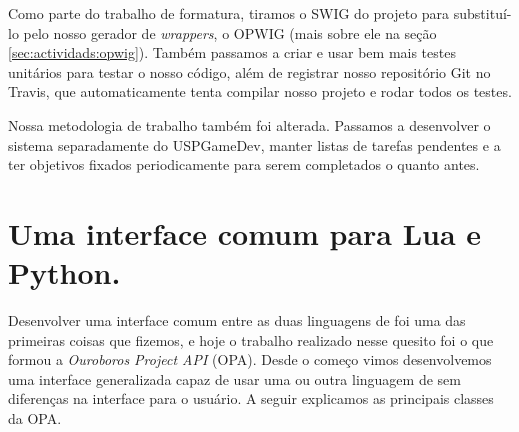 
  Como parte do trabalho de formatura, tiramos o SWIG do projeto para substituí-lo
  pelo nosso gerador de \textit{wrappers}, o OPWIG (mais sobre ele na seção 
  \ref{sec:actividads:opwig}). Também passamos a criar e usar bem mais testes
  unitários para testar o nosso código, além de registrar nosso repositório Git
  no Travis\footnotemark, que automaticamente tenta compilar nosso projeto e
  rodar todos os testes.
  
  
  Nossa metodologia de trabalho também foi alterada. Passamos a desenvolver o
  sistema separadamente do USPGameDev, manter listas de tarefas pendentes e a
  ter objetivos fixados periodicamente para serem completados o quanto antes.
  
  \section{Uma interface comum para Lua e Python.}
  \label{sec:atividades:opa}
  Desenvolver uma interface comum entre as duas linguagens de \script{} foi uma das 
  primeiras coisas que fizemos, e hoje o trabalho realizado nesse quesito foi o que
  formou a \emph{Ouroboros Project API} (OPA). Desde o começo vimos desenvolvemos uma
  interface generalizada capaz de usar uma ou outra linguagem de \script{} sem
  diferenças na interface para o usuário. A seguir explicamos as principais
  classes da OPA.
  

